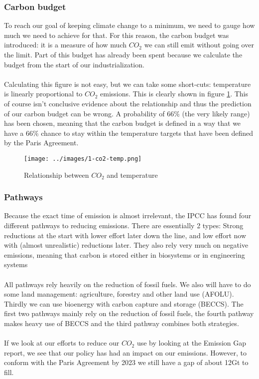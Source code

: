 \documentclass[../summary.tex]{subfiles}
\begin{document}
			\newpage
			\subsubsection{Carbon budget}
				To reach our goal of keeping climate change to a minimum, we need to gauge how much we need to achieve for that. For this reason, the carbon budget was introduced: it is a measure of how much $CO_2$ we can still emit without going over the limit. Part of this budget has already been spent because we calculate the budget from the start of our industrialization. 
				\\\\
				Calculating this figure is not easy, but we can take some short-cuts: temperature is linearly proportional to $CO_2$ emissions. This is clearly shown in figure \ref{fig:1-co2-temp}. This of course isn't conclusive evidence about the relationship and thus the prediction of our carbon budget can be wrong. A probability of 66\% (the very likely range) has been chosen, meaning that the carbon budget is defined in a way that we have a 66\% chance to stay within the temperature targets that have been defined by the Paris Agreement.
				\begin{figure}[h]
					\centering
					\texttt{[image: ../images/1-co2-temp.png]}
					\caption{Relationship between $CO_2$ and temperature}
					\label{fig:1-co2-temp}
				\end{figure}
				
			\subsubsection{Pathways}
				Because the exact time of emission is almost irrelevant, the IPCC has found four different pathways to reducing emissions. There are essentially 2 types: Strong reductions at the start with lower effort later down the line, and low effort now with (almost unrealistic) reductions later. They also rely very much on negative emissions, meaning that carbon is stored either in biosystems or in engineering systems
				\\\\
				All pathways rely heavily on the reduction of fossil fuels. We also will have to do some land management: agriculture, forestry and other land use (AFOLU). Thirdly we can use bioenergy with carbon capture and storage (BECCS). The first two pathways mainly rely on the reduction of fossil fuels, the fourth pathway makes heavy use of BECCS and the third pathway combines both strategies. 
				\\\\
				If we look at our efforts to reduce our $CO_2$ use by looking at the Emission Gap report, we see that our policy has had an impact on our emissions. However, to conform with the Paris Agreement by 2023 we still have a gap of about 12Gt to fill. %
		
\end{document}
